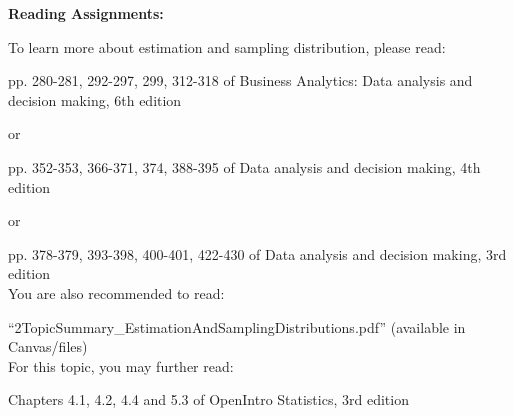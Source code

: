 \documentclass[11pt]{article}
\begin{document}
\begin{itemize}
\end{itemize}


\noindent\textbf{Reading Assignments:}



To learn more about estimation and sampling distribution, please read:

pp. 280-281, 292-297, 299, 312-318 of Business Analytics: Data analysis and decision making, 6th edition

or 

pp. 352-353, 366-371, 374, 388-395 of Data analysis and decision making, 4th edition

or 

pp. 378-379, 393-398, 400-401, 422-430 of  Data analysis and decision making, 3rd edition\\


You are also recommended to read:

``2TopicSummary\_EstimationAndSamplingDistributions.pdf'' (available in Canvas/files) \\


For this topic, you may further read:

Chapters 4.1, 4.2, 4.4 and 5.3 of OpenIntro Statistics, 3rd edition
\end{document}
